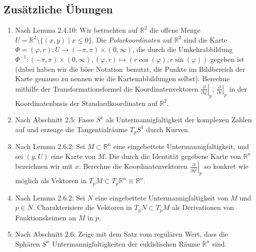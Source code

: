 \documentclass[a4paper,headsepline,headheight=30pt,numbers=enddot]{scrartcl}
\newcommand{\R}{\mathbb{R}}
\begin{document}
	\subsection*{Zusätzliche Übungen}
	\begin{enumerate}
		\item Nach Lemma 2.4.10:
			Wir betrachten auf $\R^2$ die offene Menge $U = \R^2 \setminus\{(x,y) \mid x \le 0\}$. Die \emph{Polarkoordinaten} auf $\R^2$ sind die Karte $\Phi = (\varphi,r) \colon U \to (-\pi,\pi) \times (0,\infty)$, die durch die Umkehrabbildung $\Phi^{-1}\colon (-\pi,\pi)\times(0,\infty), (\varphi,r) \mapsto (r\cos(\varphi), r\sin(\varphi))$ gegeben ist (dabei haben wir die \glqq böse Notation\grqq\ benutzt, die Punkte im Bildbereich der Karte genauso zu nennen wie die Kartenabbildungen selbst). Berechne mithilfe der Transformationsformel die Koordinatenvektoren $\left.\frac{\partial}{\partial\varphi}\right|_p$, $\left.\frac{\partial}{\partial r}\right|_p$ in der Koordinatenbasis der Standardkoordinaten auf $\R^2$.
		\item Nach Abschnitt 2.5:
			Fasse $S^1$ als Untermannigfaltigkeit der komplexen Zahlen auf und erzeuge die Tangentialräume $T_pS^1$ durch Kurven.
		\item Nach Lemma 2.6.2:
			Sei $M \subset \R^n$ eine eingebettete Untermannigfaltigkeit, und sei $(y,U)$ eine Karte von $M$. Die durch die Identität gegebene Karte von $\R^n$ bezeichnen wir mit $x$. Berechne die Koordinatenvektoren $\left.\frac{\partial}{\partial y^i}\right|_p$ so konkret wie möglich als Vektoren in $T_pM \subset T_p\R^n \equiv \R^n$.
		\item Nach Lemma 2.6.2:
			Sei $N$ eine eingebettete Untermannigfaltigkeit von $M$ und $p\in N$. Charakterisiere die Vektoren in $T_pN \subset T_pM$ als Derivationen von Funktionskeimen an $M$ in $p$.
		\item Nach Abschnitt 2.6: Zeige mit dem Satz vom regulären Wert, dass die Sphären $S^n$ Untermannigfaltigkeiten der euklidischen Räume $\R^n$ sind.
	\end{enumerate}

	\newpage
\end{document}
